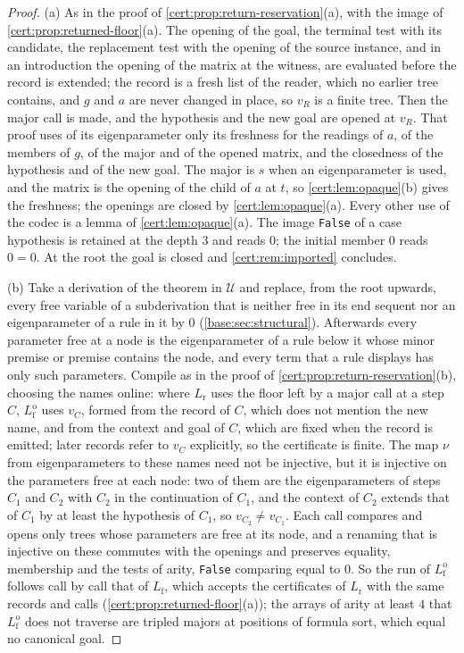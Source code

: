 \begin{proof}
(a) As in the proof of \cref{cert:prop:return-reservation}(a), with the image of
\cref{cert:prop:returned-floor}(a). The opening of the goal, the terminal test with its candidate,
the replacement test with the opening of the source instance, and in an introduction the opening
of the matrix at the witness, are evaluated before the record is extended; the record is a fresh
list of the reader, which no earlier tree contains, and $g$ and $a$ are never changed in place,
so $v_R$ is a finite tree. Then the major call is made, and the hypothesis and the new goal are
opened at $v_R$. That proof uses of its eigenparameter only its freshness for the readings of
$a$, of the members of $g$, of the major and of the opened matrix, and the closedness of the
hypothesis and of the new goal. The major is $s$ when an eigenparameter is used, and the matrix is
the opening of the child of $a$ at $t$, so \cref{cert:lem:opaque}(b) gives the freshness; the
openings are closed by \cref{cert:lem:opaque}(a). Every other use of the codec is a lemma of
\cref{cert:lem:opaque}(a). The image \texttt{False} of a case hypothesis is retained at the depth
$3$ and reads $0$; the initial member $0$ reads $0=0$. At the root the goal is closed and
\cref{cert:rem:imported} concludes.

(b) Take a derivation of the theorem in $\mathcal U$ and replace, from the root upwards, every
free variable of a subderivation that is neither free in its end sequent nor an eigenparameter of
a rule in it by $0$ (\cref{base:sec:structural}). Afterwards every parameter free at a node is the
eigenparameter of a rule below it whose minor premise or premise contains the node, and every term
that a rule displays has only such parameters. Compile as in the proof of
\cref{cert:prop:return-reservation}(b), choosing the names online: where $L_{\mathrm r}$ uses the
floor left by a major call at a step $C$, $L^{\mathrm o}_{\mathrm f}$ uses $v_C$, formed from the
record of $C$, which does not mention the new name, and from the context and goal of $C$, which are
fixed when the record is emitted; later records refer to $v_C$ explicitly, so the certificate is
finite. The map $\nu$ from eigenparameters to these names need not be injective, but it is
injective on the parameters free at each node: two of them are the eigenparameters of steps $C_1$
and $C_2$ with $C_2$ in the continuation of $C_1$, and the context of $C_2$ extends that of $C_1$ by
at least the hypothesis of $C_1$, so $v_{C_2}\neq v_{C_1}$. Each call compares and opens only
trees whose parameters are free at its node, and a renaming that is injective on these commutes
with the openings and preserves equality, membership and the tests of arity, \texttt{False}
comparing equal to $0$. So the run of $L^{\mathrm o}_{\mathrm f}$ follows call by call that of
$L_{\mathrm f}$, which accepts the certificates of $L_{\mathrm r}$ with the same records and calls
(\cref{cert:prop:returned-floor}(a)); the arrays of arity at least $4$ that
$L^{\mathrm o}_{\mathrm f}$ does not traverse are tripled majors at positions of formula sort, which
equal no canonical goal.
\end{proof}
